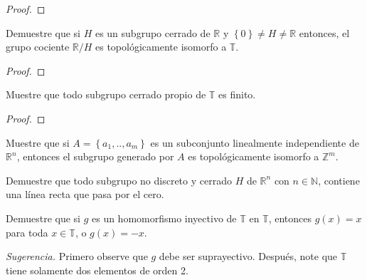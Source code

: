\documentclass[12pt]{report}
\theoremstyle{largebreak}
\begin{document}
    \begin{proof}
        
    \end{proof}

    \begin{excer}
        Demuestre que si $H$ es un subgrupo cerrado de $\mathbb{R}$ y $\left\{0 \right\}\neq H\neq\mathbb{R}$ entonces, el grupo cociente $\mathbb{R}/H$ es topológicamente isomorfo a $\mathbb{T}$.
    \end{excer}

    \begin{proof}
        
    \end{proof}

    \begin{excer}
        Muestre que todo subgrupo cerrado propio de $\mathbb{T}$ es finito.
    \end{excer}

    \begin{proof}
        
    \end{proof}

    \begin{excer}
        Muestre que si $A=\left\{a_1,..,a_m \right\}$ es un subconjunto linealmente independiente de $\mathbb{R}^n$, entonces el subgrupo generado por $A$ es topológicamente isomorfo a $\mathbb{Z}^m$.
    \end{excer}

    \begin{excer}
        Demuestre que todo subgrupo no discreto y cerrado $H$ de $\mathbb{R}^n$ con $n\in\mathbb{N}$, contiene una línea recta que pasa por el cero.
    \end{excer}

    \begin{excer}
        Demuestre que si $g$ es un homomorfismo inyectivo de $\mathbb{T}$ en $\mathbb{T}$, entonces $g(x)=x$ para toda $x\in\mathbb{T}$, o $g(x)=-x$.

        \textit{Sugerencia.} Primero observe que $g$ debe ser suprayectivo. Después, note que $\mathbb{T}$ tiene solamente dos elementos de orden 2.
    \end{excer}
\end{document}
